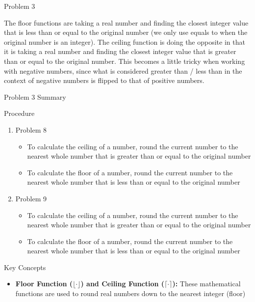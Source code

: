 \begin{problem}{Problem 3}
    \begin{highlight}[Insights]
        The floor functions are taking a real number and finding the closest integer value that is less than or equal to the original number (we only use equals to when the original number is an integer). 
        The ceiling function is doing the opposite in that it is taking a real number and finding the closest integer value that is greater than or equal to the original number. This becomes a little tricky
        when working with negative numbers, since what is considered greater than / less than in the context of negative numbers is flipped to that of positive numbers.
    \end{highlight}
\end{problem}

\begin{summary}{Problem 3 Summary}
    \begin{statement}{Procedure}
        \begin{enumerate}[start = 8]
            \item Problem 8
            \begin{itemize}
                \item To calculate the ceiling of a number, round the current number to the nearest whole number that is greater than or equal to the original number
                \item To calculate the floor of a number, round the current number to the nearest whole number that is less than or equal to the original number
            \end{itemize}
            \item Problem 9
            \begin{itemize}
                \item To calculate the ceiling of a number, round the current number to the nearest whole number that is greater than or equal to the original number
                \item To calculate the floor of a number, round the current number to the nearest whole number that is less than or equal to the original number
            \end{itemize}
        \end{enumerate}
    \end{statement}
    \begin{statement}{Key Concepts}
        \begin{itemize}
            \item \textbf{Floor Function ($\lfloor \cdot \rfloor$) and Ceiling Function ($\lceil \cdot \rceil$):} These mathematical functions are used to round real numbers down to the nearest integer (floor) 

\end{itemize}
\end{statement}
\end{summary}
